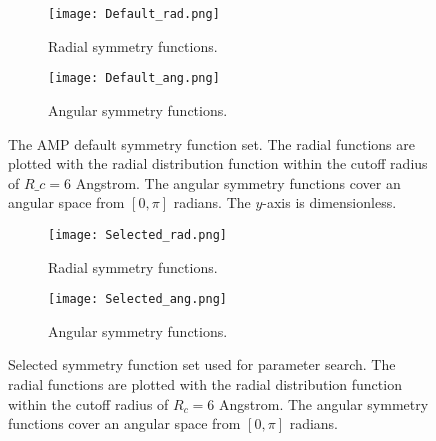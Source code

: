 \begin{figure}[H]
\begin{adjustbox}{max width=1.2\linewidth,center}
\centering
  \begin{subfigure}[b]{0.55\textwidth}
      \texttt{[image: Default\_rad.png]}
      \caption{Radial symmetry functions.}
    \label{fig:f1}
  \end{subfigure}
  \hfill
  \begin{subfigure}[b]{0.55\textwidth}
      \texttt{[image: Default\_ang.png]}
      \caption{Angular symmetry functions.}
    \label{fig:f2}
  \end{subfigure}
\end{adjustbox}
    \caption{The AMP default symmetry function set. The radial functions
    are plotted with the radial distribution function within
    the cutoff radius of $R\_c = 6$ Angstrom. The angular symmetry
    functions cover an angular space from $\left[0, \pi\right]$ radians.
    The $y$-axis is dimensionless.}
    \label{fig:default}
\end{figure}

\begin{figure}[H]
\begin{adjustbox}{max width=1.2\linewidth,center}
\centering
  \begin{subfigure}[b]{0.55\textwidth}
      \texttt{[image: Selected\_rad.png]}
      \caption{Radial symmetry functions.}
    \label{fig:f1}
  \end{subfigure}
  \hfill
  \begin{subfigure}[b]{0.55\textwidth}
      \texttt{[image: Selected\_ang.png]}
      \caption{Angular symmetry functions.}
    \label{fig:f2}
  \end{subfigure}
\end{adjustbox}
    \caption{Selected symmetry function set used for parameter search.
    The radial functions
    are plotted with the radial distribution function within
    the cutoff radius of $R_c = 6$ Angstrom. The angular symmetry
    functions cover an angular space from $\left[0, \pi\right]$ radians.}
    \label{fig:selected}
\end{figure}

